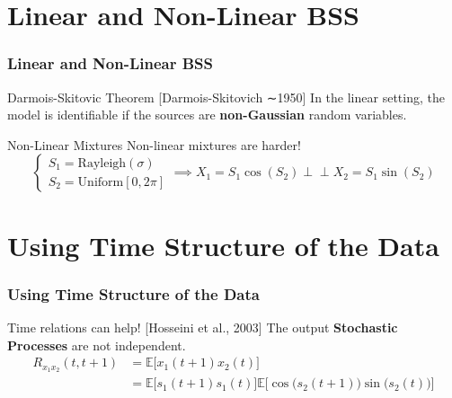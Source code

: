 \documentclass[usenames,dvipsnames]{beamer}
\begin{document}
\section{Linear and Non-Linear BSS}
\begin{frame}
\frametitle{Linear and Non-Linear BSS}
\begin{alertblock}{Darmois-Skitovic Theorem \small{[Darmois-Skitovich ∼1950]}}
In the linear setting, the model is identifiable if the sources are \textbf{non-Gaussian} random variables.
\end{alertblock}
\pause
\begin{exampleblock}{Non-Linear Mixtures}
Non-linear mixtures are harder!
\small{
\begin{equation*}
\begin{cases}

S_1 = \mathrm{Rayleigh}(\sigma)\\
S_2 = \mathrm{Uniform} [0, 2\pi]
\end{cases}
\implies
X_1 = S_1 \cos (S_2) \perp \!\!\! \perp X_2 =  S_1 \sin (S_2)
\end{equation*}
}
\end{exampleblock}
\end{frame}
\normalsize

\section{Using Time Structure of the Data}
\begin{frame}
\frametitle{Using Time Structure of the Data}
\begin{block}{Time relations can help! \small{[Hosseini et al., 2003]}}
The output \textbf{Stochastic Processes} are not independent.
	\begin{align*}
	R_{x_1x_2}(t, t+1) &= \mathbb{E}\big[{x_1(t+1)x_2(t)}\big]\\
	&= \mathbb{E}\Big[s_1(t+1)s_1(t)\Big]
	\mathbb{E}\Big[\cos\big(s_2(t+1)\big)\sin\big(s_2(t)\big)\Big]
	\end{align*}
\end{block}  
\end{frame}
\end{document}
